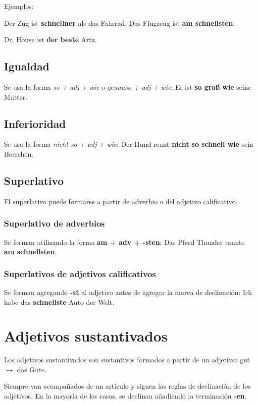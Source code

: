 Ejemplos: 
\begin{myitemize}
\item Der Zug ist \textbf{schnellner} als das Fahrrad. Das Flugzeug ist \textbf{am schnellsten}.
\item Dr. House ist \textbf{der beste} Artz.
\end{myitemize}

\subsection{Igualdad}
Se usa la forma \textit{so + adj + wie} o \textit{genauso + adj + wie}: Er ist \textbf{so groß wie} seine Mutter.

\subsection{Inferioridad}
Se usa la forma \textit{nicht so + adj + wie}: Der Hund rennt \textbf{nicht so schnell wie} sein Herrchen.

\subsection{Superlativo}
El superlativo puede formarse a partir de adverbio o del adjetivo calificativo.
\subsubsection{Superlativo de adverbios}
Se forman utilizando la forma \textbf{am + adv + -sten}: Das Pferd Thunder rannte \textbf{am schnellsten}.

\subsubsection{Superlativos de adjetivos calificativos}
Se forman agregando \textbf{-st} al adjetivo antes de agregar la marca de declinación: Ich habe das \textbf{schnellste} Auto der Welt.

\section{Adjetivos sustantivados}
Los adjetivos sustantivados son sustantivos formados a partir de un adjetivo: gut $\rightarrow$ das Gute.

Siempre van acompañados de un artículo y siguen las reglas de declinación de los adjetivos. En la mayoría de los casos, se declinan añadiendo la terminación \textbf{-en}.

